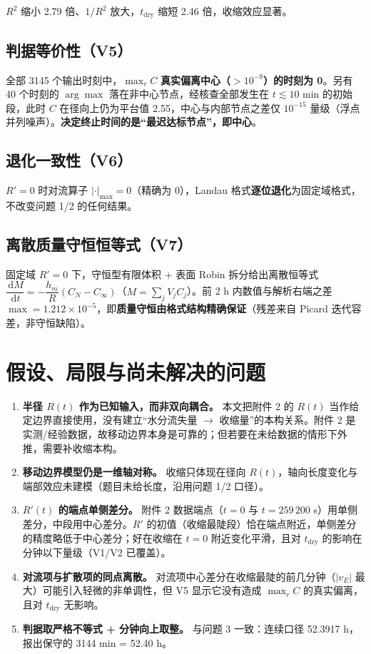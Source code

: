 \documentclass[11pt]{ctexart}
\newcommand{\dd}{\,\mathrm{d}}
\begin{document}
$R^2$ 缩小 2.79 倍、$1/R^2$ 放大，$t_\text{dry}$ 缩短 2.46 倍，收缩效应显著。

\subsection{判据等价性（V5）}

全部 3145 个输出时刻中，$\max_r C$ \textbf{真实偏离中心（$>10^{-9}$）的时刻为 0}。另有 40 个时刻的 $\arg\max$ 落在非中心节点，经核查全部发生在 $t\lesssim10$ min 的初始段，此时 $C$ 在径向上仍为平台值 2.55，中心与内部节点之差仅 $10^{-15}$ 量级（浮点并列噪声）。\textbf{决定终止时间的是``最迟达标节点''，即中心}。

\subsection{退化一致性（V6）}

$R'=0$ 时对流算子 $|\cdot|_{\max}=0$（精确为 0），Landau 格式\textbf{逐位退化}为固定域格式，不改变问题 1/2 的任何结果。

\subsection{离散质量守恒恒等式（V7）}

固定域 $R'=0$ 下，守恒型有限体积 + 表面 Robin 拆分给出离散恒等式 $\dfrac{\dd M}{\dd t}=-\dfrac{h_m}{R}(C_N-C_\infty)$（$M=\sum_jV_jC_j$）。前 2 h 内数值与解析右端之差 $\max=1.212\times10^{-5}$，即\textbf{质量守恒由格式结构精确保证}（残差来自 Picard 迭代容差，非守恒缺陷）。

\section{假设、局限与尚未解决的问题}

\begin{enumerate}
\item \textbf{半径 $R(t)$ 作为已知输入，而非双向耦合。} 本文把附件 2 的 $R(t)$ 当作给定边界直接使用，没有建立``水分流失量 $\to$ 收缩量''的本构关系。附件 2 是实测/经验数据，故移动边界本身是可靠的；但若要在未给数据的情形下外推，需要补收缩本构。
\item \textbf{移动边界模型仍是一维轴对称。} 收缩只体现在径向 $R(t)$，轴向长度变化与端部效应未建模（题目未给长度，沿用问题 1/2 口径）。
\item \textbf{$R'(t)$ 的端点单侧差分。} 附件 2 数据端点（$t=0$ 与 $t=259\,200$ s）用单侧差分，中段用中心差分。$R'$ 的初值（收缩最陡段）恰在端点附近，单侧差分的精度略低于中心差分；好在收缩在 $t=0$ 附近变化平滑，且对 $t_\text{dry}$ 的影响在分钟以下量级（V1/V2 已覆盖）。
\item \textbf{对流项与扩散项的同点离散。} 对流项中心差分在收缩最陡的前几分钟（$|v_E|$ 最大）可能引入轻微的非单调性，但 V5 显示它没有造成 $\max_r C$ 的真实偏离，且对 $t_\text{dry}$ 无影响。
\item \textbf{判据取严格不等式 + 分钟向上取整。} 与问题 3 一致：连续口径 52.3917 h，报出保守的 3144 min = 52.40 h。
\end{enumerate}
\end{document}
